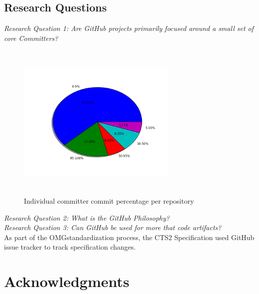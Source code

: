 \documentclass{proc}
\begin{document}
\subsection{Research Questions}
\emph{Research Question 1: Are GitHub projects primarily focused around a small set of core Committers?}\\
\begin{figure}
\includegraphics[height=3in,width=3in]{images/committers_percentage_pie_chart.png}
\caption{Individual committer commit percentage per repository}
\end{figure}

\emph{Research Question 2: What is the GitHub Philosophy?}\\

\emph{Research Question 3: Can GitHub be used for more that code artifacts?}\\
As part of the OMG\textregistered standardization process, the CTS2 Specification used GitHub issue tracker to track specification changes.

\section{Acknowledgments}


  


\end{document}
